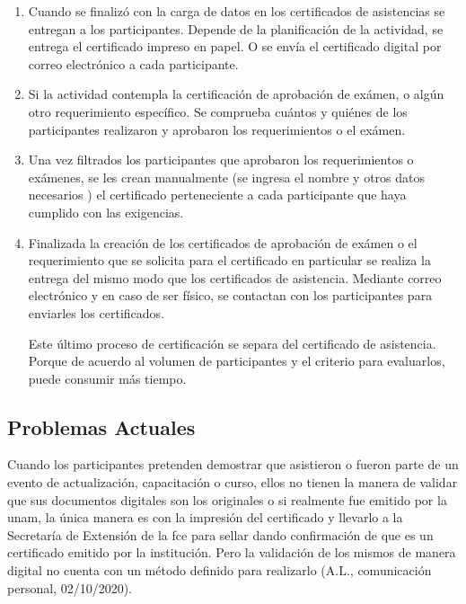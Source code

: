 \begin{enumerate}
    \item Cuando se finalizó con la carga de datos en los certificados de asistencias se entregan a los participantes.
    Depende de la planificación de la actividad, se entrega el certificado impreso en papel.
    O se envía el certificado digital por correo electrónico a cada participante.  
    
    
    
    \item Si la actividad contempla la certificación de aprobación de exámen, o 
    algún otro requerimiento específico. Se comprueba cuántos y quiénes de 
    los participantes  realizaron y aprobaron los requerimientos o el exámen.
   
    \item Una vez filtrados  los participantes que aprobaron los requerimientos o
    exámenes, se les crean manualmente (se ingresa el nombre y otros datos necesarios )
    el certificado perteneciente a cada participante que haya cumplido con las exigencias. 
    
    \item Finalizada la creación de los certificados de aprobación de exámen o 
    el requerimiento que se solicita para el certificado en particular se realiza
    la entrega del mismo modo que los certificados de asistencia. Mediante
    correo electrónico y en caso de ser físico, se contactan con los participantes para enviarles los certificados.
    
    Este último proceso de certificación se separa del certificado de asistencia.
    Porque de acuerdo al volumen de participantes y el criterio para evaluarlos, puede consumir más tiempo.
\end{enumerate} 

\subsection{Problemas Actuales}
Cuando  los participantes pretenden demostrar que asistieron o fueron parte de un evento de actualización, capacitación
o curso, ellos no tienen la manera de validar que sus documentos
digitales son los originales o si realmente fue emitido por la \gls{unam}, la única manera es con la impresión  del certificado 
y llevarlo a la Secretaría de Extensión de la \gls{fce} para  sellar  dando confirmación de que es un certificado emitido por la institución. Pero 
la validación de los mismos de manera digital no cuenta con un método definido para realizarlo (A.L., comunicación personal, 02/10/2020).%


